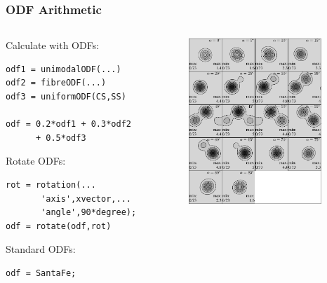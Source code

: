 \begin{frame}[fragile]
  \frametitle{ODF Arithmetic}


  \begin{columns}
    \begin{column}{6cm}

      Calculate with ODFs:
\begin{lstlisting}
odf1 = unimodalODF(...)
odf2 = fibreODF(...)
odf3 = uniformODF(CS,SS)

odf = 0.2*odf1 + 0.3*odf2
      + 0.5*odf3

\end{lstlisting}

  Rotate ODFs:
\begin{lstlisting}
rot = rotation(...
       'axis',xvector,...
       'angle',90*degree);
odf = rotate(odf,rot)
\end{lstlisting}


  Standard ODFs:
\begin{lstlisting}
odf = SantaFe;
\end{lstlisting}


\end{column}
\begin{column}{5cm}
  \includegraphics[width=5cm]{pic/santafeeh}
\end{column}
\end{columns}

\end{frame}

